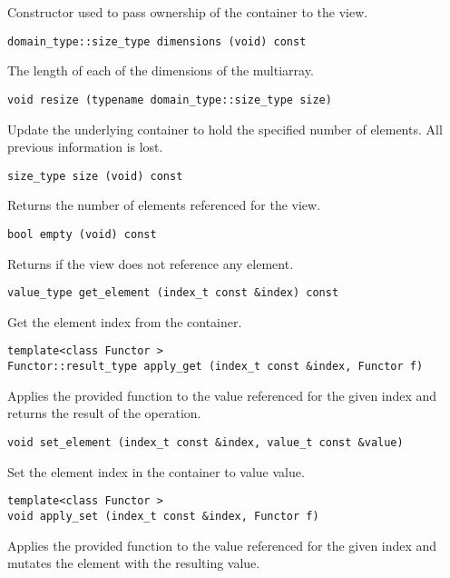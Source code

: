 Constructor used to pass ownership of the container to the view.

\begin{verbatim}
domain_type::size_type dimensions (void) const
\end{verbatim}

The length of each of the dimensions of the multiarray.

\begin{verbatim}
void resize (typename domain_type::size_type size)
\end{verbatim}

Update the underlying container to hold the specified number of elements.
All previous information is lost.

\begin{verbatim}
size_type size (void) const
\end{verbatim}

Returns the number of elements referenced for the view.

\begin{verbatim}
bool empty (void) const
\end{verbatim}

Returns if the view does not reference any element.

\begin{verbatim}
value_type get_element (index_t const &index) const
\end{verbatim}

Get the element index from the container.

\begin{verbatim}
template<class Functor >
Functor::result_type apply_get (index_t const &index, Functor f)
\end{verbatim}

Applies the provided function to the value referenced for the given index and returns the result of the operation.

\begin{verbatim}
void set_element (index_t const &index, value_t const &value)
\end{verbatim}

Set the element index in the container to value value.

\begin{verbatim}
template<class Functor >
void apply_set (index_t const &index, Functor f)
\end{verbatim}

Applies the provided function to the value referenced for the given index and mutates the element with the resulting value.

